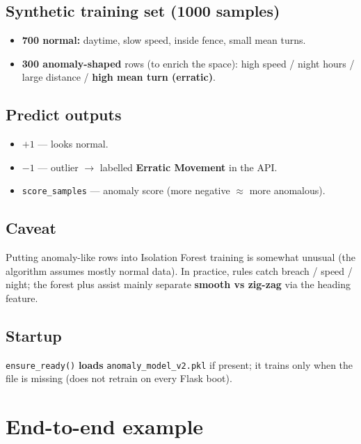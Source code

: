 \documentclass[11pt,a4paper]{article}
\begin{document}
\subsection{Synthetic training set (1000 samples)}
\begin{itemize}[leftmargin=*]
  \item \textbf{700 normal:} daytime, slow speed, inside fence, small mean turns.
  \item \textbf{300 anomaly-shaped} rows (to enrich the space):
        high speed / night hours / large distance / \textbf{high mean turn (erratic)}.
\end{itemize}

\subsection{Predict outputs}
\begin{itemize}[leftmargin=*]
  \item $+1$ --- looks normal.
  \item $-1$ --- outlier $\rightarrow$ labelled \textbf{Erratic Movement} in the API.
  \item \texttt{score\_samples} --- anomaly score (more negative $\approx$ more anomalous).
\end{itemize}

\subsection{Caveat}
Putting anomaly-like rows into Isolation Forest training is somewhat unusual
(the algorithm assumes mostly normal data). In practice, rules catch breach / speed / night;
the forest plus assist mainly separate \textbf{smooth vs zig-zag} via the heading feature.

\subsection{Startup}
\texttt{ensure\_ready()} \textbf{loads} \texttt{anomaly\_model\_v2.pkl} if present;
it trains only when the file is missing (does not retrain on every Flask boot).

\section{End-to-end example}
\end{document}
